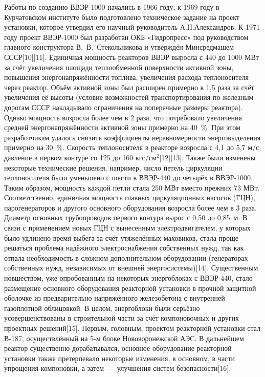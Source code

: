 \documentclass[14pt]{article}
\begin{document}
Работы по созданию ВВЭР-1000 начались в 1966 году, к 1969 году в Курчатовском институте было подготовлено техническое задание на проект установки, которое утвердил его научный руководитель А.П.Александров. К 1971 году проект ВВЭР-1000 был разработан ОКБ «Гидропресс» под руководством главного конструктора В. В. Стекольникова и утверждён Минсредмашем СССР[10][11]. 
Единичная мощность реакторов ВВЭР выросла с 440 до 1000 МВт за счёт увеличения площади теплообменной поверхности активной зоны, повышения энергонапряжённости топлива, увеличения расхода теплоносителя через реактор. Объём активной зоны был расширен примерно в 1,5 раза за счёт увеличения её высоты (условие возможностей транспортирования по железным дорогам СССР накладывало ограничения на поперечные размеры реактора). Однако мощность возросла более чем в 2 раза, что потребовало увеличения средней энергонапряжённости активной зоны примерно на 40 \%. При этом разработчикам удалось снизить коэффициенты неравномерности энерговыделения примерно на 30 \%. Скорость теплоносителя в реакторе возросла с 4,1 до 5,7 м/с, давление в первом контуре со 125 до 160 кгс/см$^{2}$[12][13]. 
Также были изменены некоторые технические решения, например, число петель циркуляции теплоносителя было уменьшено с шести в ВВЭР-440 до четырёх в ВВЭР-1000. Таким образом, мощность каждой петли стала 250 МВт вместо прежних 73 МВт. Соответственно, единичная мощность главных циркуляционных насосов (ГЦН), парогенераторов и другого основного оборудования возросла более чем в 3 раза. Диаметр основных трубопроводов первого контура вырос с 0,50 до 0,85 м. В связи с применением новых ГЦН с вынесенным электродвигателем, у которых было удлинено время выбега за счёт утяжелённых маховиков, стала проще решаться проблема надёжного электроснабжения собственных нужд, так как отпала необходимость в сложном дополнительном оборудовании (генераторах собственных нужд, независимых от внешней энергосистемы)[14]. 
Существенным новшеством, уже опробованным на некоторых энергоблоках с ВВЭР-440, стало размещение основного оборудования реакторной установки в прочной защитной оболочке из предварительно напряжённого железобетона с внутренней газоплотной облицовкой. В целом, энергоблоки были серьёзно усовершенствованы в строительной части за счёт компоновочных и других проектных решений[15]. 
Первым, головным, проектом реакторной установки стал В-187, осуществлённый на 5-м блоке Нововоронежской АЭС. В дальнейшем реактор существенно дорабатывался, основное оборудование реакторной установки также претерпевало некоторые изменения, в основном, в части упрощения компоновки, а затем — улучшения систем безопасности[16]. 
\end{document}
